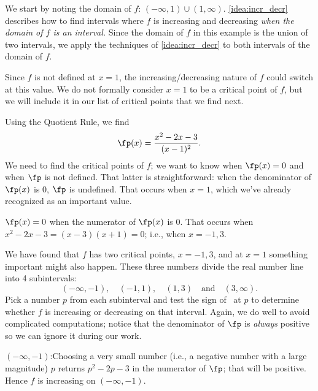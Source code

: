 {We start by noting the domain of $f$: $(-\infty,1)\cup(1,\infty)$. \autoref{idea:incr_decr} describes how to find intervals where $f$ is increasing and decreasing \textit{when the domain of $f$ is an interval.} Since the domain of $f$ in this example is the union of two intervals, we apply the techniques of \autoref{idea:incr_decr} to both intervals of the domain of $f$. 

Since $f$ is not defined at $x=1$, the increasing/decreasing nature of $f$ could switch at this value. We do not formally consider $x=1$ to be a critical point of $f$, but we will include it in our list of critical points that we find next.

Using the Quotient Rule, we find
\[\fp(x) = \frac{x^2-2x-3}{(x-1)^2}.\]
We need to find the critical points of $f$; we want to know when $\fp(x)=0$ and when $\fp$ is not defined. That latter is straightforward: when the denominator of $\fp(x)$ is 0, $\fp$ is undefined. That occurs when $x=1$, which we've already recognized as an important value.


$\fp(x)=0$ when the numerator of $\fp(x)$ is 0. That occurs when $x^2-2x-3 = (x-3)(x+1) = 0$; i.e., when $x=-1,3$. 

We have found that $f$ has two critical points, $x=-1,3$, and at $x=1$ something important might also happen. These three numbers divide the real number line into 4 subintervals:
\[(-\infty,-1), \quad (-1, 1), \quad (1,3) \quad \text{and} \quad (3,\infty).\]
Pick a number $p$ from each subinterval and test the sign of \fp\ at $p$ to determine whether $f$ is increasing or decreasing on that interval. Again, we do well to avoid complicated computations; notice that the denominator of $\fp$ is \textit{always} positive so we can ignore it during our work.

\iflatexml\begin{description}\else\begin{description}[leftmargin=0pt]\fi
\item[Interval 1,] $(-\infty,-1)$:\quad  Choosing a very small number (i.e., a negative number with a large magnitude) $p$ returns $p^2-2p-3$ in the numerator of $\fp$; that will be positive. Hence $f$ is increasing on $(-\infty,-1)$.


\end{description}
\end{description}}
